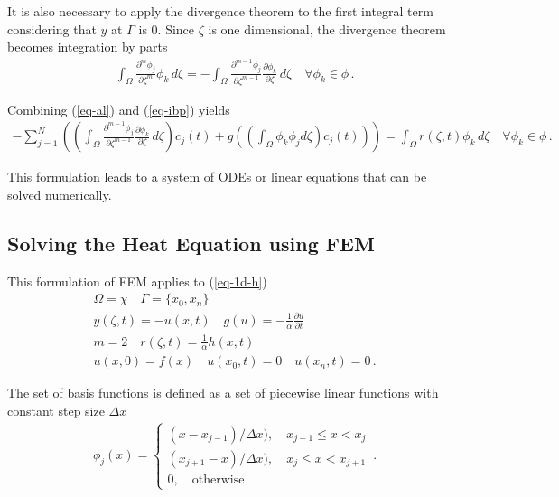 It is also necessary to apply the divergence theorem to the first integral term considering that \(y\) at \(\Gamma\) is 0.
Since \(\zeta\) is one dimensional, the divergence theorem becomes integration by parts
\begin{gather}
\int_{\Omega} \frac{\partial^{m} \phi_{j}}{\partial \zeta^{m}} \phi_{k} \, d\zeta = - \int_{\Omega} \frac{\partial^{m-1} \phi_{j}}{\partial \zeta^{m-1}} \frac{\partial \phi_{k}}{\partial \zeta} \, d\zeta \quad \forall \phi_{k} \in \phi \,. \label{eq-ibp}
\end{gather}

Combining (\ref{eq-al}) and (\ref{eq-ibp}) yields
\begin{gather}
-\sum_{j = 1}^{N} \left(\left(\int_{\Omega} \frac{\partial^{m-1} \phi_{j}}{\partial \zeta^{m-1}} \frac{\partial \phi_{k}}{\partial \zeta} \, d\zeta\right) c_{j}(t) + g\left(\left(\int_{\Omega} \phi_k \phi_j d\zeta\right) c_{j}(t)\right)\right)  = \int_{\Omega}  r(\zeta, t) \phi_{k}        \, d\zeta \quad \forall \phi_{k} \in \phi \,. \label{eq-fem}
\end{gather}

This formulation leads to a system of ODEs or linear equations that can be solved numerically.
\subsection{Solving the Heat Equation using FEM}
This formulation of FEM applies to (\ref{eq-1d-h})
\begin{gather}
\Omega = \chi \quad \Gamma = \{x_{0}, x_{n}\} \\
y(\zeta, t) = -u(x, t) \quad g(u) = -\frac{1}{\alpha} \frac{\partial u}{\partial t} \\
m = 2 \quad r(\zeta, t) = \frac{1}{\alpha} h(x,t) \\
u(x, 0) = f(x) \quad u(x_{0}, t) = 0 \quad u(x_{n}, t) = 0 \,.
\end{gather}

The set of basis functions is defined as a set of piecewise linear functions with constant step size \(\Delta x\) \cite{Gustafsson2011d}
\begin{gather}
    \phi_j(x)= 
\begin{cases}
    (x - x_{j-1}) / \Delta x), \quad x_{j-1} \leq x <  x_{j}\\
    (x_{j+1} - x) / \Delta x), \quad x_{j} \leq x <  x_{j + 1}\\
    0,              \quad \text{otherwise}
\end{cases} \,.
\end{gather}


